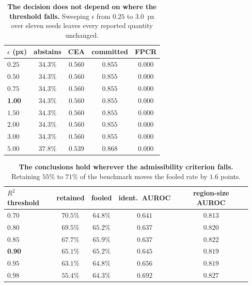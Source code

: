 \documentclass{article} %
\theoremstyle{defstyle}
\theoremstyle{plain}
\begin{document}
\begin{table}[!ht]
\caption{\textbf{The decision does not depend on where the threshold falls.} Sweeping $\epsilon$ from
$0.25$ to $3.0$~px over eleven seeds leaves every reported quantity unchanged.}
\label{tab:supp-epsilon}
\begin{center}
\footnotesize
\begin{tabular}{lcccc}
\toprule
$\epsilon$ (px) & \textbf{abstains} & \textbf{CEA} & \textbf{committed} & \textbf{FPCR} \\
\midrule
$0.25$ & $34.3\%$ & $0.560$ & $0.855$ & $0.000$ \\
$0.50$ & $34.3\%$ & $0.560$ & $0.855$ & $0.000$ \\
$0.75$ & $34.3\%$ & $0.560$ & $0.855$ & $0.000$ \\
\textbf{1.00} & $\mathbf{34.3\%}$ & $\mathbf{0.560}$ & $\mathbf{0.855}$ & $\mathbf{0.000}$ \\
$1.50$ & $34.3\%$ & $0.560$ & $0.855$ & $0.000$ \\
$2.00$ & $34.3\%$ & $0.560$ & $0.855$ & $0.000$ \\
$3.00$ & $34.3\%$ & $0.560$ & $0.855$ & $0.000$ \\
$5.00$ & $37.8\%$ & $0.539$ & $0.868$ & $0.000$ \\
\bottomrule
\end{tabular}
\end{center}
\end{table}

\begin{table}[!ht]
\caption{\textbf{The conclusions hold wherever the admissibility criterion falls.} Retaining $55\%$ to
$71\%$ of the benchmark moves the fooled rate by $1.6$ points.}
\label{tab:supp-admissibility}
\begin{center}
\footnotesize
\begin{tabular}{lcccc}
\toprule
$R^2$ threshold & \textbf{retained} & \textbf{fooled} & \textbf{ident.\ AUROC} & \textbf{region-size AUROC} \\
\midrule
$0.70$ & $70.5\%$ & $64.8\%$ & $0.641$ & $0.813$ \\
$0.80$ & $69.5\%$ & $65.2\%$ & $0.637$ & $0.820$ \\
$0.85$ & $67.7\%$ & $65.9\%$ & $0.637$ & $0.822$ \\
\textbf{0.90} & $\mathbf{65.1\%}$ & $\mathbf{65.2\%}$ & $\mathbf{0.645}$ & $0.819$ \\
$0.95$ & $63.1\%$ & $64.8\%$ & $0.656$ & $0.819$ \\
$0.98$ & $55.4\%$ & $64.3\%$ & $0.692$ & $0.827$ \\
\bottomrule
\end{tabular}
\end{center}
\end{table}
\end{document}
